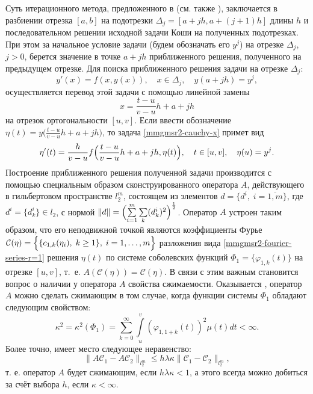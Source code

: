 Суть итерационного метода, предложенного в \cite{mmgmsr2-SHII-Demi2017-ODESystems} (см. также \cite{mmgmsr2-SHII-MMG-Demi2017-CosOde}), заключается в разбиении отрезка $[a,b]$ на подотрезки $\Delta_j=[a+jh,a+(j+1)h]$ длины $h$ и последовательном решении исходной задачи Коши на полученных подотрезках.
При этом за начальное условие задачи (будем обозначать его $y^j$) на отрезке $\Delta_j$, $j>0$, берется значение в точке $a+jh$ приближенного решения, полученного на предыдущем отрезке. Для поиска приближенного решения задачи на отрезке $\Delta_j$:
\begin{equation}\label{mmgmsr2-cauchy-x}
y'(x)=f(x,y(x)), \quad x \in \Delta_j, \quad y(a+jh)=y^j,
\end{equation}
осуществляется перевод этой задачи с помощью линейной замены
\begin{equation*}
x=\frac{t-u}{v-u}h+a+jh
\end{equation*}
на отрезок ортогональности $[u,v]$. Если ввести обозначение $\eta(t)=y\bigl(\frac{t-u}{v-u}h+a+jh\bigr)$, то задача \eqref{mmgmsr2-cauchy-x} примет вид
\begin{equation}\label{mmgmsr2-cauchy-problem-eta}
\eta'(t)=\frac{h}{v-u}f\Bigl(\frac{t-u}{v-u}h+a+jh,\eta(t)\Bigr), \quad t \in [u,v], \quad \eta(u)=y^j.
\end{equation}
Построение приближенного решения полученной задачи производится с помощью специальным образом сконструированного оператора $A$, действующего в гильбертовом пространстве $l^m_2$, состоящем из элементов $d=\{d^i,\; i=\overline{1,m}\}$, где $d^i=\{d^i_k\} \in l_2$, с нормой $\|d\|=\Bigl(\sum\limits_{i=1}^m \sum\limits_{k} (d_k^i)^2\Bigr)^{\frac{1}{2}}$.
Оператор $A$ устроен таким образом, что его неподвижной точкой являются коэффициенты Фурье $\mathcal{C}(\eta)=\Bigl\{ \{c_{1,k}(\eta_i), \; k \ge 1 \}, \; i = 1, \ldots, m \Bigr\}$ разложения вида \eqref{mmgmsr2-fourier-series-r=1} решения $\eta(t)$ по системе соболевских функций $\Phi_1=\{\varphi_{1,k}(t)\}$ на отрезке $[u,v]$, т.~е. $A(\mathcal{C}(\eta))=\mathcal{C}(\eta)$.
В связи с этим важным становится вопрос о наличии у оператора $A$ свойства сжимаемости.
Оказывается \cite{mmgmsr2-SHII-Demi2017-ODESystems}, оператор $A$ можно сделать сжимающим в том случае, когда функции системы $\Phi_1$ обладают следующим свойством:
\begin{equation}\label{mmgmsr2-finite-sum-prop}
\kappa^2=\kappa^2(\Phi_1)=
\sum\limits_{k=0}^{\infty}
\int\limits_{u}^{v}
(\varphi_{1,1+k}(t))^2 \mu(t)dt < \infty.
\end{equation}
Более точно, имеет место следующее неравенство:
\begin{equation*}
\|A\mathcal{C}_1 - A\mathcal{C}_2\|_{l_2^m} \le h \lambda \kappa \|\mathcal{C}_1-\mathcal{C}_2\|_{l_2^m},
\end{equation*}
т. е. оператор $A$ будет сжимающим, если $h \lambda \kappa < 1$, а этого всегда можно добиться за счёт выбора $h$, если $\kappa < \infty$.

